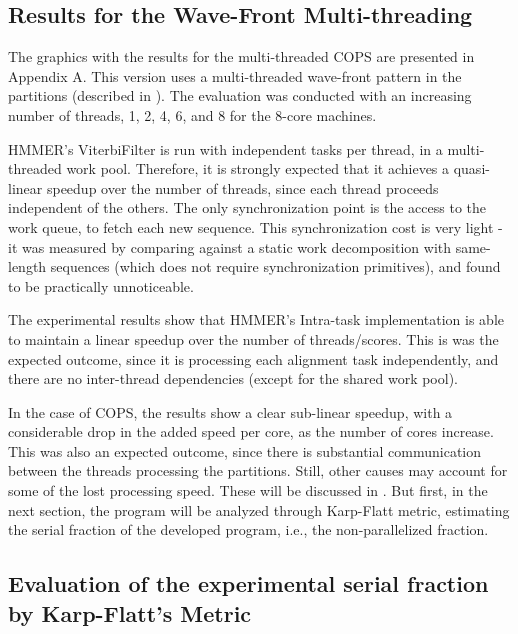 \subsection{Results for the Wave-Front Multi-threading}
\label{Results for the Wave-Front Multi-threading}

The graphics with the results for the multi-threaded COPS are presented in Appendix A. This version uses a multi-threaded wave-front pattern in the partitions (described in ). The evaluation was conducted with an increasing number of threads, 1, 2, 4, 6, and 8 for the 8-core machines.

HMMER's ViterbiFilter is run with independent tasks per thread, in a multi-threaded work pool. Therefore, it is strongly expected that it achieves a quasi-linear speedup over the number of threads, since each thread proceeds independent of the others. The only synchronization point is the access to the work queue, to fetch each new sequence. This synchronization cost is very light - it was measured by comparing against a static work decomposition with same-length sequences (which does not require synchronization primitives), and found to be practically unnoticeable.

The experimental results show that HMMER's Intra-task implementation is able to maintain a linear speedup over the number of threads/scores. This is was the expected outcome, since it is processing each alignment task independently, and there are no inter-thread dependencies (except for the shared work pool).

In the case of COPS, the results show a clear sub-linear speedup, with a considerable drop in the added speed per core, as the number of cores increase. This was also an expected outcome, since there is substantial communication between the threads processing the partitions. Still, other causes may account for some of the lost processing speed. These will be discussed in . But first, in the next section, the program will be analyzed through Karp-Flatt metric, estimating the serial fraction of the developed program, i.e., the non-parallelized fraction.



\subsection{Evaluation of the experimental serial fraction by Karp-Flatt's Metric}

